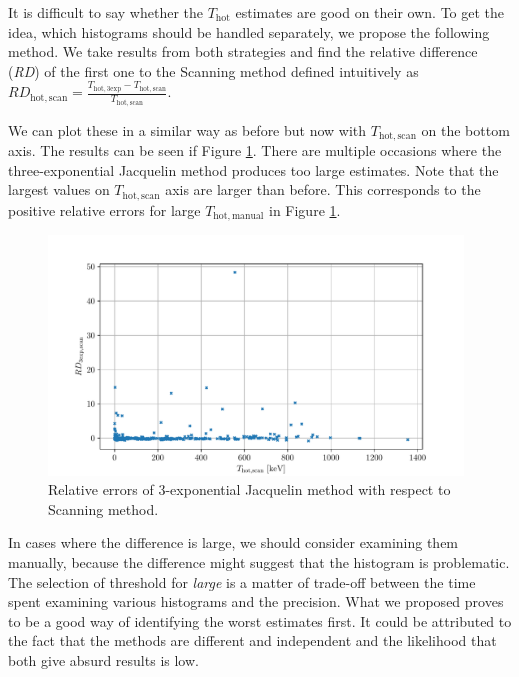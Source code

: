 It is difficult to say whether the $T_\mathrm{hot}$ estimates are good on their own. To get the idea, which histograms should be handled separately, we propose the following method. We take results from both strategies and find the relative difference (\textit{RD}) of the first one to the Scanning method defined intuitively as $RD_\mathrm{hot,scan} = \frac{T_\mathrm{hot,3exp}-T_\mathrm{hot,scan}}{T_\mathrm{hot,scan}}$.

We can plot these in a similar way as before but now with $T_\mathrm{hot,scan}$ on the bottom axis. The results can be seen if Figure \ref{fig:relative-errors-two}. There are multiple occasions where the three-exponential Jacquelin method produces too large estimates. Note that the largest values on $T_\mathrm{hot,scan}$ axis are larger than before. This corresponds to the positive relative errors for large $T_\mathrm{hot,manual}$ in Figure \ref{fig:relative-errors-two}.

\begin{figure}[h]
	\centering
	\includegraphics[width=0.98\textwidth]{figures/relative-error2}
	\caption{Relative errors of 3-exponential Jacquelin method with respect to Scanning method.}
	\label{fig:relative-errors-two}
\end{figure}

In cases where the difference is large, we should consider examining them manually, because the difference might suggest that the histogram is problematic. The selection of threshold for \textit{large} is a matter of trade-off between the time spent examining various histograms and the precision. What we proposed proves to be a good way of identifying the worst estimates first. It could be attributed to the fact that the methods are different and independent and the likelihood that both give absurd results is low.

